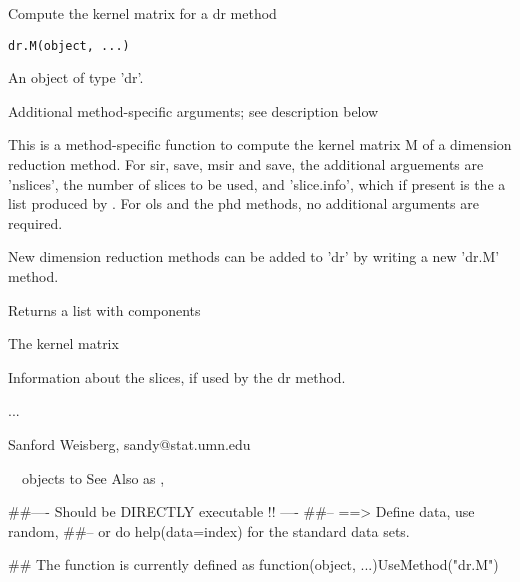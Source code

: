 \begin{Description}\relax
Compute the kernel matrix for a dr method
\end{Description}
\begin{Usage}
\begin{verbatim}
dr.M(object, ...)
\end{verbatim}
\end{Usage}
\begin{Arguments}
\begin{ldescription}
\item[\code{object}] An object of type 'dr'. 
\item[\code{...}] Additional method-specific arguments; see description below
\end{ldescription}
\end{Arguments}
\begin{Details}\relax
This is a method-specific function to compute the kernel matrix M of a
dimension reduction method.  For sir, save, msir and save, the additional 
arguements are 'nslices', the number of slices to be used, and 'slice.info',
which if present is the a list produced by .  For ols and
the phd methods, no additional arguments are required.

New dimension reduction methods can be added to 'dr' by writing a new 'dr.M' 
method.
\end{Details}
\begin{Value}
Returns a list with components
\begin{ldescription}
\item[\code{M }] The kernel matrix
\item[\code{slice.info }] Information about the slices, if used by the dr method.
\end{ldescription}

...
\end{Value}
\begin{Author}\relax
Sanford Weisberg, sandy@stat.umn.edu
\end{Author}
\begin{SeeAlso}\relax
~~objects to See Also as , ~~~
\end{SeeAlso}
\begin{Examples}
\begin{ExampleCode}
##---- Should be DIRECTLY executable !! ----
##-- ==>  Define data, use random,
##--    or do  help(data=index)  for the standard data sets.

## The function is currently defined as
function(object, ...){UseMethod("dr.M")}
\end{ExampleCode}
\end{Examples}

